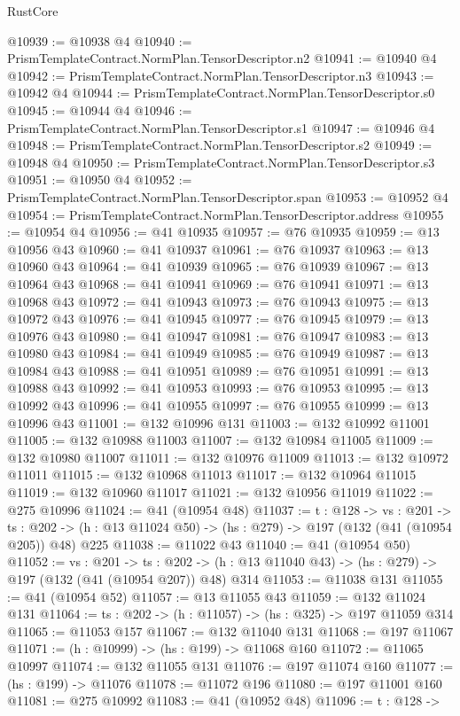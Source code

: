 \begin{lexlean}{RustCore}
\begin{coremodule}
@10939 := @10938 @4
@10940 := PrismTemplateContract.NormPlan.TensorDescriptor.n2
@10941 := @10940 @4
@10942 := PrismTemplateContract.NormPlan.TensorDescriptor.n3
@10943 := @10942 @4
@10944 := PrismTemplateContract.NormPlan.TensorDescriptor.s0
@10945 := @10944 @4
@10946 := PrismTemplateContract.NormPlan.TensorDescriptor.s1
@10947 := @10946 @4
@10948 := PrismTemplateContract.NormPlan.TensorDescriptor.s2
@10949 := @10948 @4
@10950 := PrismTemplateContract.NormPlan.TensorDescriptor.s3
@10951 := @10950 @4
@10952 := PrismTemplateContract.NormPlan.TensorDescriptor.span
@10953 := @10952 @4
@10954 := PrismTemplateContract.NormPlan.TensorDescriptor.address
@10955 := @10954 @4
@10956 := @41 @10935
@10957 := @76 @10935
@10959 := @13 @10956 @43
@10960 := @41 @10937
@10961 := @76 @10937
@10963 := @13 @10960 @43
@10964 := @41 @10939
@10965 := @76 @10939
@10967 := @13 @10964 @43
@10968 := @41 @10941
@10969 := @76 @10941
@10971 := @13 @10968 @43
@10972 := @41 @10943
@10973 := @76 @10943
@10975 := @13 @10972 @43
@10976 := @41 @10945
@10977 := @76 @10945
@10979 := @13 @10976 @43
@10980 := @41 @10947
@10981 := @76 @10947
@10983 := @13 @10980 @43
@10984 := @41 @10949
@10985 := @76 @10949
@10987 := @13 @10984 @43
@10988 := @41 @10951
@10989 := @76 @10951
@10991 := @13 @10988 @43
@10992 := @41 @10953
@10993 := @76 @10953
@10995 := @13 @10992 @43
@10996 := @41 @10955
@10997 := @76 @10955
@10999 := @13 @10996 @43
@11001 := @132 @10996 @131
@11003 := @132 @10992 @11001
@11005 := @132 @10988 @11003
@11007 := @132 @10984 @11005
@11009 := @132 @10980 @11007
@11011 := @132 @10976 @11009
@11013 := @132 @10972 @11011
@11015 := @132 @10968 @11013
@11017 := @132 @10964 @11015
@11019 := @132 @10960 @11017
@11021 := @132 @10956 @11019
@11022 := @275 @10996
@11024 := @41 (@10954 @48)
@11037 := {t : @128} ->
  {vs : @201} ->
  {ts : @202} -> (h : @13 @11024 @50) -> (hs : @279) -> @197 (@132 (@41 (@10954 @205)) @48) @225
@11038 := @11022 @43
@11040 := @41 (@10954 @50)
@11052 := {vs : @201} ->
  {ts : @202} -> (h : @13 @11040 @43) -> (hs : @279) -> @197 (@132 (@41 (@10954 @207)) @48) @314
@11053 := @11038 @131
@11055 := @41 (@10954 @52)
@11057 := @13 @11055 @43
@11059 := @132 @11024 @131
@11064 := {ts : @202} -> (h : @11057) -> (hs : @325) -> @197 @11059 @314
@11065 := @11053 @157
@11067 := @132 @11040 @131
@11068 := @197 @11067
@11071 := (h : @10999) -> (hs : @199) -> @11068 @160
@11072 := @11065 @10997
@11074 := @132 @11055 @131
@11076 := @197 @11074 @160
@11077 := (hs : @199) -> @11076
@11078 := @11072 @196
@11080 := @197 @11001 @160
@11081 := @275 @10992
@11083 := @41 (@10952 @48)
@11096 := {t : @128} ->

\end{coremodule}
\end{lexlean}
